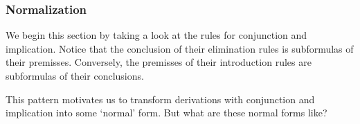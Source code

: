 \documentclass[12pt,a4paper]{article}
\theoremstyle{definition}
\newtheorem{example}{Example}[section]
\begin{document}



\subsubsection{Normalization}
\label{Normalization}

We begin this section by taking a look at the rules for conjunction and implication. Notice that the conclusion of their elimination rules is subformulas of their premisses. Conversely, the premisses of their introduction rules are subformulas of their conclusions.

This pattern motivates us to transform derivations with conjunction and implication into some `normal' form. But what are these normal forms like? 
\end{document}

